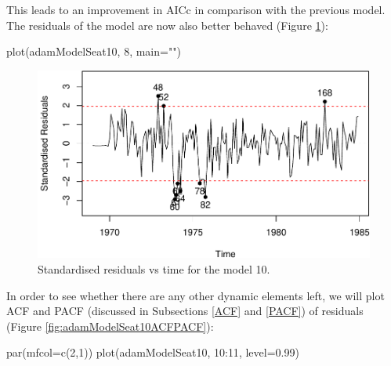\documentclass[
]{book}
\newenvironment{Shaded}{\begin{snugshade}}{\end{snugshade}}
\newcommand{\AttributeTok}[1]{\textcolor[rgb]{0.77,0.63,0.00}{#1}}
\newcommand{\DecValTok}[1]{\textcolor[rgb]{0.00,0.00,0.81}{#1}}
\newcommand{\FloatTok}[1]{\textcolor[rgb]{0.00,0.00,0.81}{#1}}
\newcommand{\FunctionTok}[1]{\textcolor[rgb]{0.00,0.00,0.00}{#1}}
\newcommand{\NormalTok}[1]{#1}
\newcommand{\SpecialCharTok}[1]{\textcolor[rgb]{0.00,0.00,0.00}{#1}}
\newcommand{\StringTok}[1]{\textcolor[rgb]{0.31,0.60,0.02}{#1}}
\theoremstyle{definition}
\theoremstyle{definition}
\theoremstyle{definition}
\theoremstyle{definition}
\theoremstyle{remark}
\begin{document}
This leads to an improvement in AICc in comparison with the previous model. The residuals of the model are now also better behaved (Figure \ref{fig:adamModelSeat10ResidvsTime}):

\begin{Shaded}
\begin{Highlighting}[]
\FunctionTok{plot}\NormalTok{(adamModelSeat10, }\DecValTok{8}\NormalTok{, }\AttributeTok{main=}\StringTok{""}\NormalTok{)}
\end{Highlighting}
\end{Shaded}

\begin{figure}
\centering
\includegraphics{Svetunkov--2022----ADAM_files/figure-latex/adamModelSeat10ResidvsTime-1.pdf}
\caption{\label{fig:adamModelSeat10ResidvsTime}Standardised residuals vs time for the model 10.}
\end{figure}

In order to see whether there are any other dynamic elements left, we will plot ACF and PACF (discussed in Subsections \ref{ACF} and \ref{PACF}) of residuals (Figure \ref{fig:adamModelSeat10ACFPACF}):

\begin{Shaded}
\begin{Highlighting}[]
\FunctionTok{par}\NormalTok{(}\AttributeTok{mfcol=}\FunctionTok{c}\NormalTok{(}\DecValTok{2}\NormalTok{,}\DecValTok{1}\NormalTok{))}
\FunctionTok{plot}\NormalTok{(adamModelSeat10, }\DecValTok{10}\SpecialCharTok{:}\DecValTok{11}\NormalTok{, }\AttributeTok{level=}\FloatTok{0.99}\NormalTok{)}
\end{Highlighting}
\end{Shaded}
\end{document}
